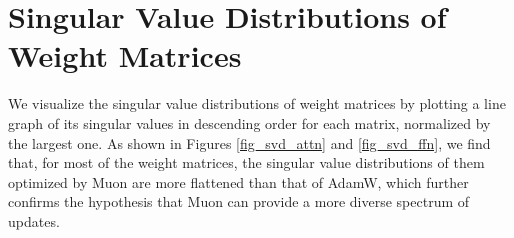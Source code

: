 \section{Singular Value Distributions of Weight Matrices}
\label{sec:appendix:svd}
We visualize the singular value distributions of weight matrices by plotting a line graph of its singular values in descending order for each matrix, normalized by the largest one. As shown in Figures \ref{fig_svd_attn} and \ref{fig_svd_ffn}, we find that, for most of the weight matrices, the singular value distributions of them optimized by Muon are more flattened than that of AdamW, which further confirms the hypothesis that Muon can provide a more diverse spectrum of updates.



